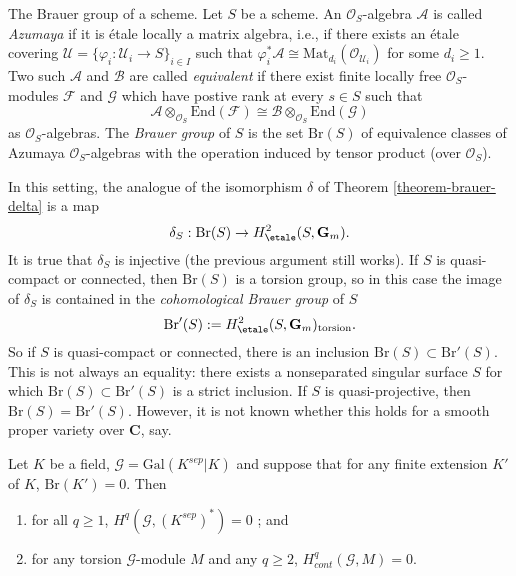 \noindent
The Brauer group of a scheme.
Let $S$ be a scheme. An $\mathcal{O}_S$-algebra $\mathcal{A}$ is called
{\it Azumaya} if it is \'etale locally a matrix algebra, i.e., if there
exists an \'etale covering $\mathcal{U} = \{ \varphi_i : \mathcal{U}_i \to S
\}_{i \in I}$ such that $\varphi_i^*\mathcal{A} \cong
\text{Mat}_{d_i}(\mathcal{O}_{\mathcal{U}_i})$ for some $d_i \geq 1$. Two such
$\mathcal{A}$ and $\mathcal{B}$ are called {\it equivalent} if there exist
finite locally free $\mathcal{O}_S$-modules $\mathcal{F}$ and $\mathcal{G}$
which have postive rank at every $s \in S$ such that
$$
\mathcal{A} \otimes_{\mathcal{O}_S} \text{End}(\mathcal{F})
\cong
\mathcal{B} \otimes_{\mathcal{O}_S} \text{End}(\mathcal{G})
$$
as $\mathcal{O}_S$-algebras. The {\it Brauer group} of
$S$ is the set $\text{Br}(S)$ of equivalence classes of Azumaya
$\mathcal{O}_S$-algebras with the operation induced by tensor product (over
$\mathcal{O}_S$).

\medskip\noindent
In this setting, the analogue of the isomorphism $\delta$ of
Theorem \ref{theorem-brauer-delta}
is a map
$$
\delta_S: \text{Br}(S) \to H_\etale^2(S, \mathbf{G}_m).
$$
It is true that $\delta_S$ is injective (the previous argument still works). If
$S$ is quasi-compact or connected, then $\text{Br}(S)$ is a torsion group, so
in this case the image of $\delta_S$ is contained in the {\it cohomological
Brauer group} of $S$
$$
\text{Br}'(S) := H_\etale^2(S, \mathbf{G}_m)_\text{torsion}.
$$
So if $S$ is quasi-compact or connected, there is an inclusion $\text{Br}(S)
\subset \text{Br}'(S)$. This is not always an equality: there exists a
nonseparated singular surface $S$ for which $\text{Br}(S) \subset
\text{Br}'(S)$ is a strict inclusion. If $S$ is quasi-projective, then
$\text{Br}(S) = \text{Br}'(S)$. However, it is not known whether this holds for
a smooth proper variety over $\mathbf{C}$, say.


\begin{proposition}
\label{proposition-serre-galois}
Let $K$ be a field, $\mathcal{G} = \text{Gal}(K^{sep}|K)$ and suppose that for
any finite extension $K'$ of $K$, $\text{Br}(K') = 0$. Then
\begin{enumerate}
\item
for all $ q \geq 1$, $H^q (\mathcal{G}, (K^{sep})^*) = 0$ ; and
\item
for any torsion $\mathcal{G}$-module $M$ and any $q \geq 2$, $H_{cont}^q
(\mathcal{G}, M) = 0$.
\end{enumerate}
\end{proposition}


